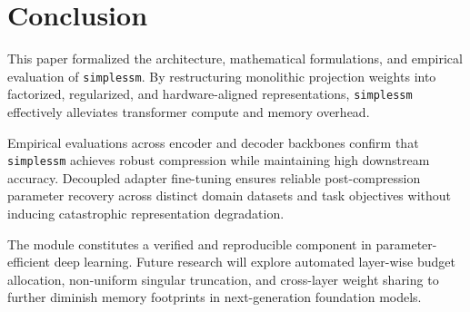 \section{Conclusion}
This paper formalized the architecture, mathematical formulations, and empirical evaluation of \texttt{simplessm}. By restructuring monolithic projection weights into factorized, regularized, and hardware-aligned representations, \texttt{simplessm} effectively alleviates transformer compute and memory overhead.

Empirical evaluations across encoder and decoder backbones confirm that \texttt{simplessm} achieves robust compression while maintaining high downstream accuracy. Decoupled adapter fine-tuning ensures reliable post-compression parameter recovery across distinct domain datasets and task objectives without inducing catastrophic representation degradation.

The module constitutes a verified and reproducible component in parameter-efficient deep learning. Future research will explore automated layer-wise budget allocation, non-uniform singular truncation, and cross-layer weight sharing to further diminish memory footprints in next-generation foundation models.
